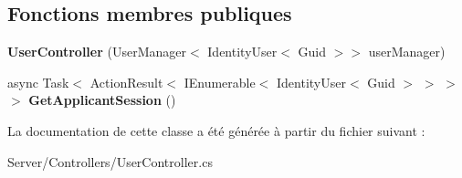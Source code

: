 \subsection*{Fonctions membres publiques}
\begin{DoxyCompactItemize}
\item 
\mbox{\label{class_mediwatch_1_1_server_1_1_controllers_1_1_user_controller_a89d244c8a5946e09f79ce662d42ff582}} 
{\bfseries User\+Controller} (User\+Manager$<$ Identity\+User$<$ Guid $>$$>$ user\+Manager)
\item 
\mbox{\label{class_mediwatch_1_1_server_1_1_controllers_1_1_user_controller_a4d73dac7143e677dfdede71ecc0151b0}} 
async Task$<$ Action\+Result$<$ I\+Enumerable$<$ Identity\+User$<$ Guid $>$ $>$ $>$ $>$ {\bfseries Get\+Applicant\+Session} ()
\end{DoxyCompactItemize}


La documentation de cette classe a été générée à partir du fichier suivant \+:\begin{DoxyCompactItemize}
\item 
Server/\+Controllers/User\+Controller.\+cs\end{DoxyCompactItemize}
